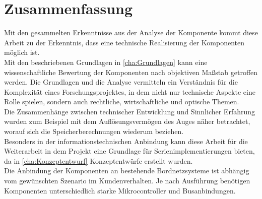 \chapter{Zusammenfassung}
\label{cha:zusammenfassung}
Mit den gesammelten Erkenntnisse aus der Analyse der Komponente kommt diese Arbeit zu der Erkenntnis, dass eine technische Realisierung der Komponenten möglich ist. \\
Mit den beschriebenen Grundlagen in \ref{cha:Grundlagen} kann eine wissenschaftliche Bewertung der Komponenten nach objektiven Maßstab getroffen werden. Die Grundlagen und die Analyse vermitteln ein Verständnis für die Komplexität eines Forschungsprojektes, in dem nicht nur technische Aspekte eine Rolle spielen, sondern auch rechtliche, wirtschaftliche und optische Themen. \\
Die Zusammenhänge zwischen technischer Entwicklung und Sinnlicher Erfahrung wurden zum Beispiel mit dem Auflösungsvermögen des Auges näher betrachtet, worauf sich die Speicherberechnungen wiederum beziehen. \\
Besonders in der informationstechnischen Anbindung kann diese Arbeit für die Weiterarbeit in dem Projekt eine Grundlage für Serienimplementierungen bieten, da in \ref{cha:Konzeptentwurf} Konzeptentwürfe erstellt wurden. \\
Die Anbindung der Komponenten an bestehende Bordnetzsysteme ist abhängig vom gewünschten Szenario im Kundenverhalten. Je nach Ausführung benötigen Komponenten unterschiedlich starke Mikrocontroller und Busanbindungen.
